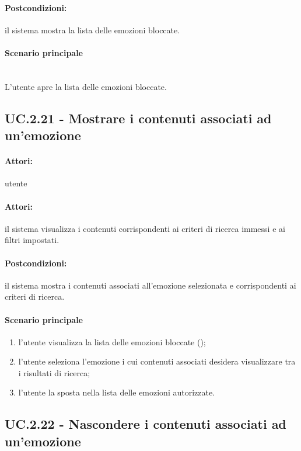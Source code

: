 \documentclass[10pt,a4paper,headinclude,footinclude,hidelinks]{scrreprt} %
\begin{document}
	\paragraph{Postcondizioni:} il sistema mostra la lista delle emozioni bloccate.
	\paragraph{Scenario principale} \hfill \\
	L'utente apre la lista delle emozioni bloccate.

	\subsection[UC.2.21]{UC.2.21 - Mostrare i contenuti associati ad un'emozione}
	\label{sec:stage:ar:uc:2_21}
	\paragraph{Attori:} utente
	\paragraph{Attori:} il sistema visualizza i contenuti corrispondenti ai criteri di ricerca immessi e ai filtri impostati.
	\paragraph{Postcondizioni:} il sistema mostra i contenuti associati all'emozione selezionata e corrispondenti ai criteri di ricerca.
	\paragraph{Scenario principale}
	\begin{enumerate}
	\item l'utente visualizza la lista delle emozioni bloccate ();
	\item l'utente seleziona l'emozione i cui contenuti associati desidera visualizzare tra i risultati di ricerca;
	\item l'utente la sposta nella lista delle emozioni autorizzate.
	\end{enumerate}

	\subsection[UC.2.22]{UC.2.22 - Nascondere i contenuti associati ad un'emozione}
	\label{sec:stage:ar:uc:2_22}
\end{document}
